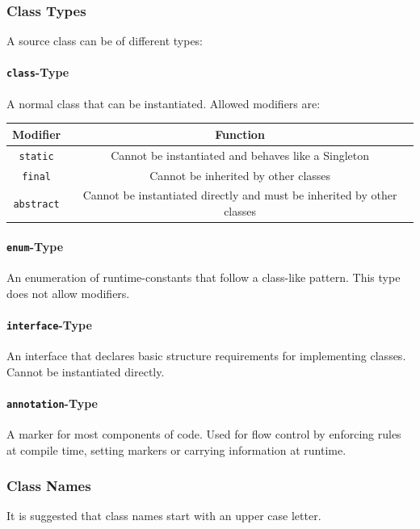 \documentclass{docs}
\begin{document}
    \subsubsection{Class Types}
    A source class can be of different types:
    
    \paragraph{\texttt{class}-Type}
    A normal class that can be instantiated.
    Allowed modifiers are:
    \begin{center}
    \begin{tabular}{c|c}
        Modifier & Function \\
        \hline
        \texttt{static} & Cannot be instantiated and behaves like a Singleton \\
        \texttt{final} & Cannot be inherited by other classes \\
        \texttt{abstract} & Cannot be instantiated directly and must be inherited by other classes
    \end{tabular}
    \end{center}
    
    \paragraph{\texttt{enum}-Type}
    An enumeration of runtime-constants that follow a class-like pattern.
    This type does not allow modifiers.
    
    \paragraph{\texttt{interface}-Type}
    An interface that declares basic structure requirements for implementing classes.
    Cannot be instantiated directly.
    
    \paragraph{\texttt{annotation}-Type}
    A marker for most components of code. Used for flow control by enforcing rules at compile time, setting markers or carrying information at runtime.
    
    \subsubsection{Class Names}
    It is suggested that class names start with an upper case letter.
    
\end{document}
